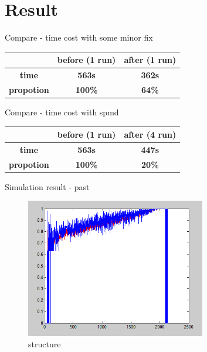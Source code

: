 \documentclass{beamer}
\begin{document}
\section{Result}

\begin{frame}{Compare - time cost with some minor fix}
    \begin{center}
        \begin{tabular}{|c|c|c|}
        \hline
        \textbf{}          & \textbf{before (1 run)} & \textbf{after (1 run)} \\ \hline
        \textbf{time}      & \textbf{563s}   & \textbf{362s}  \\ \hline
        \textbf{propotion} & \textbf{100\%}  & \textbf{64\%}  \\ \hline
        \end{tabular}
    \end{center}
\end{frame}

\begin{frame}{Compare - time cost with spmd}
    \begin{center}
        \begin{tabular}{|c|c|c|}
        \hline
        \textbf{}          & \textbf{before (1 run)} & \textbf{after (4 run)} \\ \hline
        \textbf{time}      & \textbf{563s}   & \textbf{447s}  \\ \hline
        \textbf{propotion} & \textbf{100\%}  & \textbf{20\%}  \\ \hline
        \end{tabular}
    \end{center}
\end{frame}
\begin{frame}{Simulation result - past}
    \begin{figure}[t]
        \centering
        \includegraphics[width=0.7\textwidth]{figures/past.png}
        \caption{structure}
    \end{figure}
\end{frame}
\end{document}
